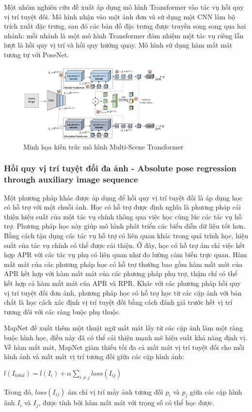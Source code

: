 Một nhóm nghiên cứu \cite{shavit2021learning, article} đề xuất áp dụng mô hình Transformer vào tác vụ hồi quy vị trí tuyệt đối. Mô hình nhận vào một ảnh đơn và sử dụng một CNN làm bộ trích xuất đặc trưng, sau đó các bản đồ đặc trưng được truyền song song qua hai nhánh: mỗi nhánh là một mô hình Transformer đảm nhiệm một tác vụ riêng lần lượt là hồi quy vị trí và hồi quy hướng quay. Mô hình sử dụng hàm mất mát tương tự với PoseNet.
\begin{figure}[H]
    \centering
    \includegraphics[width=0.7\textwidth]{pics/Chapter2/trans.png}
    \caption{Minh họa kiến trúc mô hình Multi-Scene Transformer \cite{shavit2021learning, article}}
\end{figure}

\subsubsection*{Hồi quy vị trí tuyệt đối đa ảnh - Absolute pose regression through auxiliary image sequence}
Một phương pháp khác được áp dụng để hồi quy vị trí tuyệt đối là áp dụng học có hỗ trợ với một chuỗi ảnh. Học có hỗ trợ được định nghĩa là phương pháp cải thiện hiệu suất của một tác vụ chính thông qua việc học cùng lúc các tác vụ hỗ trợ. Phương pháp học này giúp mô hình phát triển các biểu diễn dữ liệu tốt hơn. Bằng cách tận dụng các tác vụ hỗ trợ có liên quan khác trong quá trình học, hiệu suất của tác vụ chính có thể được cải thiện. Ở đây, học có hỗ trợ ám chỉ việc kết hợp APR với các tác vụ phụ có liên quan như đo lường cảm biến trực quan. Hàm mất mát của các phương pháp học có hỗ trợ thường bao gồm hàm mất mát của APR kết hợp với hàm mất mát của các phương pháp phụ trợ, thậm chí có thể kết hợp cả hàm mất mát của APR và RPR. Khác với các phương pháp hồi quy vị trí tuyệt đối đơn ảnh, phương pháp học có hỗ trợ học từ các cặp ảnh với bản chất là học cách xác định vị trí tuyệt đối bằng cách đánh giá trước hết vị trí tương đối với các ràng buộc phụ thuộc.

MapNet \cite{brahmbhatt2018geometryaware} đề xuất thêm một thuật ngữ mất mát lấy từ các cặp ảnh làm một ràng buộc hình học, điều này đã có thể cải thiện mạnh mẽ hiệu suất khả năng định vị. Về hàm mất mát, MapNet giảm thiểu tối đa cả mất mát vị trí tuyệt đối cho mỗi hình ảnh và mất mát vị trí tương đối giữa các cặp hình ảnh:
\begin{center}
    $l(I_{total}) = l(I_i) + \alpha\sum_{i\neq j}loss(I_{ij} )$
\end{center}
Trong đó, $loss(I_{ij} )$ ám chỉ vị trí máy ảnh tương đối $p_i$ và $p_j$ giữa các cặp hình ảnh $I_i$ và $I_j$, được tính bởi hàm mất mát với trọng số có thể học được.

